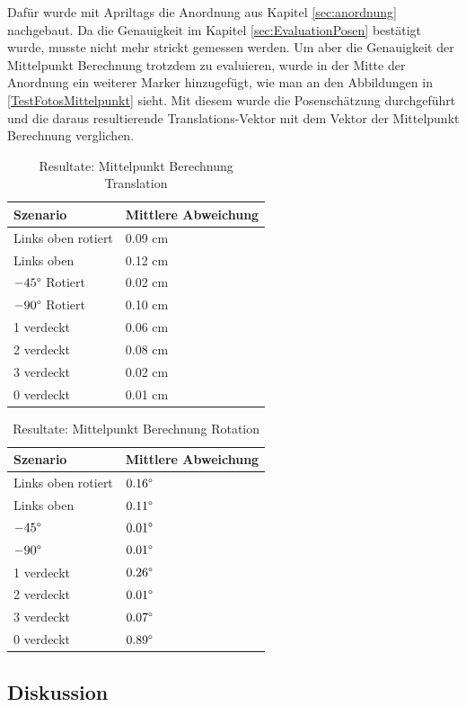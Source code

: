 Dafür wurde mit Apriltags die Anordnung aus Kapitel \ref{sec:anordnung} nachgebaut. 
Da die Genauigkeit im Kapitel \ref{sec:EvaluationPosen} bestätigt wurde, musste nicht mehr strickt gemessen werden.
Um aber die Genauigkeit der Mittelpunkt Berechnung trotzdem zu evaluieren, wurde in der Mitte der Anordnung ein weiterer Marker hinzugefügt, wie man an den Abbildungen in \ref{TestFotosMittelpunkt} sieht.
Mit diesem wurde die Posenschätzung durchgeführt und die daraus resultierende Translations-Vektor mit dem Vektor der Mittelpunkt Berechnung verglichen.

\begin{table}[!htb]
    \caption{Resultate: Mittelpunkt Berechnung Translation}
    \label{tab:MittelpunktTranslation}
        \begin{tabular}{|l|l|}
            \hline
            Szenario &  Mittlere Abweichung\\
            \hline
            Links oben rotiert & 0.09 cm\\
            \hline
            Links oben & 0.12 cm\\
            \hline
            \(-45 \degree\) Rotiert & 0.02 cm\\
            \hline
            \(-90 \degree\) Rotiert& 0.10 cm\\
            \hline
            1 verdeckt & 0.06 cm\\
            \hline
            2 verdeckt & 0.08 cm\\
            \hline
            3 verdeckt & 0.02 cm\\
            \hline
            0 verdeckt & 0.01 cm\\
            \hline
        \end{tabular}
\end{table}



\begin{table}[!htb]
    \caption{Resultate: Mittelpunkt Berechnung Rotation}
    \label{tab:MittelpunktRotation}
    \begin{tabular}{|l|l|}
            \hline
            Szenario &  Mittlere Abweichung\\
            \hline
            Links oben rotiert & \(0.16\degree\)\\
            \hline
            Links oben & \(0.11\degree\)\\
            \hline
            \(-45 \degree\) & \(0.01\degree\)\\
            \hline
            \(-90 \degree\) & \(0.01\degree\)\\
            \hline
            1 verdeckt & \(0.26\degree\)\\
            \hline
            2 verdeckt & \(0.01\degree\)\\
            \hline
            3 verdeckt & \(0.07\degree\)\\
            \hline
            0 verdeckt & \(0.89\degree\)\\
            \hline
    \end{tabular}
\end{table}



\subsection{Diskussion}